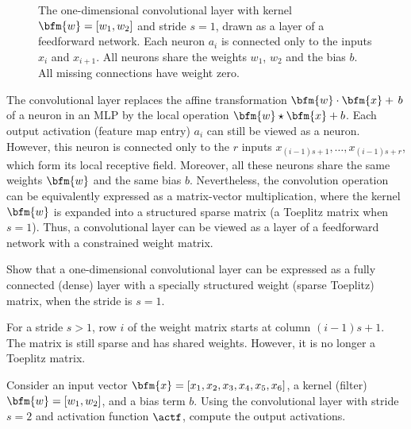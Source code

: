 \begin{figure}[ht]
\begin{center}

\end{center}
\caption{The one-dimensional convolutional layer with kernel $\bfm{w}=[w_1, w_2]$ and stride $s=1$, drawn as a layer of a feedforward network. Each neuron $a_i$ is connected only to the inputs $x_i$ and $x_{i+1}$. All neurons share the weights $w_1$, $w_2$ and the bias $b$. All missing connections have weight zero.}\label{conv1d.stride1.fig}
\end{figure}
The convolutional layer replaces the affine transformation $\bfm{w}\cdot\bfm{x}+\,b$ of a neuron in an MLP by the local operation $\bfm{w} \star \bfm{x} + b$. Each output activation (feature map entry) $a_i$ can still be viewed as a neuron. However, this neuron is connected only to the $r$ inputs $x_{(i-1)s+1}, \ldots, x_{(i-1)s+r}$, which form its local receptive field. Moreover, all these neurons share the same weights $\bfm{w}$ and the same bias $b$. Nevertheless, the convolution operation can be equivalently expressed as a matrix-vector multiplication,  where the kernel $\bfm{w}$ is expanded into a structured sparse matrix (a Toeplitz matrix when $s=1$).  Thus, a convolutional layer can be viewed as a layer of a feedforward network with a constrained weight matrix.

\begin{problem}
\label{CNNs1FNN.pro}
Show that a one-dimensional convolutional layer can be expressed as a fully connected (dense) layer with a specially structured weight (sparse Toeplitz) matrix, when the stride is $s=1$.
\end{problem}

\begin{note}
For a stride $s>1$, row $i$ of the weight matrix starts at column $(i-1)s+1$. The matrix is still sparse and has shared weights. However, it is no longer a Toeplitz matrix.
\end{note}
\begin{problem}
Consider an input vector $\bfm{x} = [x_1, x_2, x_3, x_4, x_5, x_6]$, a kernel (filter)
$\bfm{w} = [w_1, w_2]$, and a bias term $b$.
Using the convolutional layer with stride $s = 2$ and activation function $\actf$,
compute the output activations.
\end{problem}

